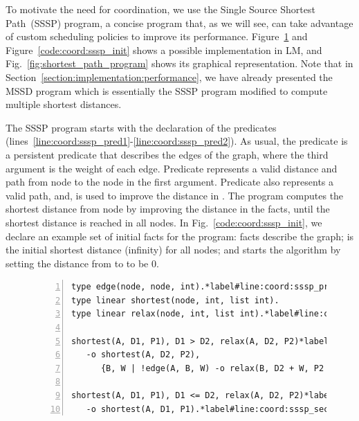 To motivate the need for coordination, we use the Single Source Shortest
Path~(SSSP) program, a concise program that, as we will see, can take advantage
of custom scheduling policies to improve its performance.
Figure~\ref{code:shortest_path_program} and Figure~\ref{code:coord:sssp_init}
shows a possible implementation in LM, and Fig.~\ref{fig:shortest_path_program}
shows its graphical representation. Note that in
Section~\ref{section:implementation:performance}, we have already presented the
MSSD program which is essentially the SSSP program modified to compute multiple
shortest distances.

The SSSP program starts with the declaration of the predicates~
(lines~\ref{line:coord:sssp_pred1}-\ref{line:coord:sssp_pred2}). As usual, the
 predicate is a persistent predicate that describes the edges of the
graph, where the third argument is the weight of each edge. Predicate
 represents a valid distance and path from node  to the
node in the first argument.  Predicate  also represents a valid
path, and, is used to improve the distance in .  The program
computes the shortest distance from node  by improving the distance in
the  facts, until the shortest distance is reached in all nodes.
In Fig.~\ref{code:coord:sssp_init}, we declare an example set of initial facts
for the program:  facts describe the graph;  is the initial shortest distance (infinity) for all nodes; and
 starts the algorithm by setting the distance from
 to  to be 0.

\begin{figure}[ht]
\begin{Verbatim}[numbers=left,fontsize=\codesize,commandchars=\*\#\&]
type edge(node, node, int).*label#line:coord:sssp_pred1&*hfill// Predicate declaration
type linear shortest(node, int, list int).
type linear relax(node, int, list int).*label#line:coord:sssp_pred2&

shortest(A, D1, P1), D1 > D2, relax(A, D2, P2)*label#line:coord:sssp_first1&*hfill// Rule 1: newly improved path
   -o shortest(A, D2, P2),
      {B, W | !edge(A, B, W) -o relax(B, D2 + W, P2 ++ [B])}.*label#line:coord:sssp_first2&

shortest(A, D1, P1), D1 <= D2, relax(A, D2, P2)*label#line:coord:sssp_second1&*hfill// Rule 2: longer path
   -o shortest(A, D1, P1).*label#line:coord:sssp_second2&
\end{Verbatim}
\label{code:shortest_path_program}
\end{figure}

